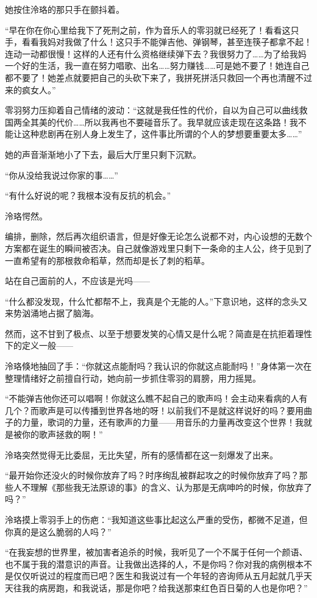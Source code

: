 \documentclass[UTF8, scheme = chinese, openany]{ctexbook}
\begin{document}
她按住泠珞的那只手在颤抖着。

“早在你在你心里给我下了死刑之前，作为音乐人的零羽就已经死了！看看这只手，看看我妈对我做了什么！这只手不能弹吉他、弹钢琴，甚至连筷子都拿不起！连动一动都很慢！这样的人还有什么资格继续弹下去？我很努力了……为了给我妈一个好的生活，我一直在努力唱歌、出名……努力赚钱……可是她不要了！她连自己都不要了！她差点就要把自己的头砍下来了，我拼死拼活只救回一个再也清醒不过来的疯女人。”

零羽努力压抑着自己情绪的波动：“这就是我任性的代价，自以为自己可以曲线救国两全其美的代价……所以我再也不要碰音乐了。我早就应该走现在这条路！我不能让这种悲剧再在别人身上发生了，这件事比所谓的个人的梦想要重要太多……”

她的声音渐渐地小了下去，最后大厅里只剩下沉默。

“你从没给我说过你家的事……”

“有什么好说的呢？我根本没有反抗的机会。”

泠珞愕然。

编排，删除，然后再次组织语言，但是好像无论怎么说都不对，内心设想的无数个方案都在诞生的瞬间被否决。自己就像游戏里只剩下一条命的主人公，终于见到了一直希望有的那根救命稻草，然而却是长了刺的稻草。

站在自己面前的人，不应该是光吗——

“什么都没发现，什么忙都帮不上，我真是个无能的人。”下意识地，这样的念头又来势汹涌地占据了脑海。

然而，这不甘到了极点、以至于想要发笑的心情又是什么呢？简直是在抗拒着理性下的定义一般——

泠珞倏地抽回了手：“你就这点能耐吗？我认识的你就这点能耐吗！”身体第一次在整理情绪好之前擅自行动，她向前一步抓住零羽的肩膀，用力摇晃。

“不能弹吉他你还可以唱啊！你就这么瞧不起自己的歌声吗！会主动来看病的人有几个？而歌声是可以传播到世界各地的呀！以前我们不是就这样说好的吗？要用曲子的力量，歌词的力量，还有歌声的力量——用音乐的力量再改变这个世界！我就是被你的歌声拯救的啊！”

泠珞突然觉得无比委屈，无比失望，所有的感情都在这一刻爆发了出来。

“最开始你还没火的时候你放弃了吗？时序绚乱被群起攻之的时候你放弃了吗？那些人不理解《那些我无法原谅的事》的含义、认为那是无病呻吟的时候，你放弃了吗？”

泠珞摸上零羽手上的伤疤：“我知道这些事比起这么严重的受伤，都微不足道，但你真的是这么脆弱的人吗？”

“在我妄想的世界里，被加害者追杀的时候，我听见了一个不属于任何一个颜语、也不属于我的潜意识的声音。让我做出选择的人，不是你吗？你对我的病例根本不是仅仅听说过的程度而已吧？医生和我说过有一个年轻的咨询师从五月起就几乎天天往我的病房跑，和我说话，那是你吧？给我送那束红色百日菊的人也是你吧？”
\end{document}
